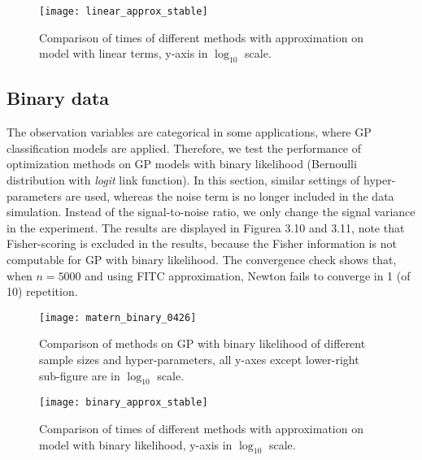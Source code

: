 \begin{figure}[hbt!]%
  \centering
  \texttt{[image: linear\_approx\_stable]} %
  \caption[Times of GP-Matern with linear regression term using approximation: line graphs with range bars]%
  {Comparison of times of different methods with approximation on model with linear terms, y-axis in $\log_{10}$ scale.}%
  \label{fig:linear_iteration}
\end{figure}

\subsection{Binary data}

The observation variables are categorical in some applications, where GP classification models are applied. Therefore, we test the performance of optimization methods on GP models with binary likelihood (Bernoulli distribution with \textit{logit} link function). In this section, similar settings of hyper-parameters are used, whereas the noise term is no longer included in the data simulation. Instead of the signal-to-noise ratio, we only change the signal variance in the experiment. The results are displayed in Figurea 3.10 and 3.11, note that Fisher-scoring is excluded in the results, because the Fisher information is not computable for GP with binary likelihood. The convergence check shows that, when $n=5000$ and using FITC approximation, Newton fails to converge in 1 (of 10) repetition.

\begin{figure}[hbt!]%
  \centering
  \texttt{[image: matern\_binary\_0426]} %
  \caption[Times of GP-Matern with Binary likelihood: line graphs with range bars]%
  {Comparison of methods on GP with binary likelihood of different sample sizes and hyper-parameters, all y-axes except lower-right sub-figure are in $\log_{10}$ scale.}%
  \label{fig:matern_binary}
\end{figure}

\begin{figure}[hbt!]%
  \centering
  \texttt{[image: binary\_approx\_stable]} %
  \caption[Times of  GP-Matern with binary likelihood using approximation: line graphs with range bars]%
  {Comparison of times of different methods with approximation on model with binary likelihood, y-axis in $\log_{10}$ scale.}%
  \label{fig:linear_iteration}
\end{figure}

